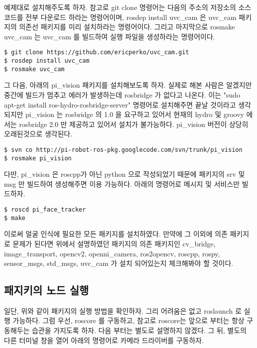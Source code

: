 예제대로 설치해주도록 하자. 참고로 git clone 명령어는 다음의 주소의 저장소의 소스코드를 전부 다운로드 하라는 명령어이며, rosdep install uvc\_cam 은 uvc\_cam 패키지의 의존선 패키지를 미리 설치하라는 명령어이다. 그리고 마지막으로 rosmake uvc\_cam 는 uvc\_cam 를 빌드하여 실행 파일을 생성하라는 명령어이다.

\begin{lstlisting}[language=ROS]
$ git clone https://github.com/ericperko/uvc_cam.git
$ rosdep install uvc_cam
$ rosmake uvc_cam
\end{lstlisting}

그 다음, 아래의 pi\_vision 패키지를 설치해보도록 하자. 실제로 해본 사람은 알겠지만 중간에 빌드가 멈추고 에러가 발생하는데 rosbridge 가 없다고 나온다.  이는 "sudo apt-get install ros-hydro-rosbridge-server" 명령어로 설치해주면 끝날 것이라고 생각되지만 pi\_vision 는 rosbridge 의 1.0 을 요구하고 있어서 현재의 hydro 및 groovy 에서는 rosbridge 2.0 만 제공하고 있어서 설치가 불가능하다. pi\_vision 버전이 상당히 오래된것으로 생각된다.

\begin{lstlisting}[language=ROS]
$ svn co http://pi-robot-ros-pkg.googlecode.com/svn/trunk/pi_vision
$ rosmake pi_vision
\end{lstlisting}

다만, pi\_vision 은 roscpp가 아닌 python 으로 작성되었기 때문에 패키지의 srv 및 msg 만 빌드하여 생성해주면 이용 가능하다.  아래의 명령어로 메시지 및 서비스만 빌드하자.

\begin{lstlisting}[language=ROS]
$ roscd pi_face_tracker
$ make
\end{lstlisting}

이로써 얼굴 인식에 필요한 모든 패키지를 설치하였다. 만약에 그 이외에 의존 패키지로 문제가 된다면 위에서 설명하였던 패키지의 의존 패키지인 cv\_bridge, image\_transport, opencv2, openni\_camera, ros2opencv, roscpp, rospy, sensor\_msgs, std\_msgs, uvc\_cam 가 설치 되어있는지 체크해봐야 할 것이다.

\subsection{패지키의 노드 실행}

일단, 위와 같이 패키지의 실행 방법을 확인하자. 그리 어려움은 없고 roslaunch 로 실행 가능하다. 그럼 우선, roscore 를 구동하고, 참고로 roscore는 앞으로 부터는 항상 구동해두는 습관을 가지도록 하자. 다음 부터는 별도로 설명하지 않겠다. 그 뒤, 별도의 다른 터미널 창을 열어 아래의 명령어로 카메라 드라이버를 구동하자.

